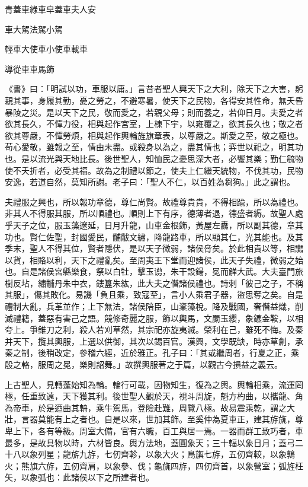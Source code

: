 
\begin{pinyinscope}
青蓋車綠車皁蓋車夫人安

車大駕法駕小駕

輕車大使車小使車載車

導從車車馬飾

《書》曰：「明試以功，車服以庸。」言昔者聖人興天下之大利，除天下之大害，躬親其事，身履其勤，憂之勞之，不避寒暑，使天下之民物，各得安其性命，無夭昏暴陵之災。是以天下之民，敬而愛之，若親父母；則而養之，若仰日月。夫愛之者欲其長久，不憚力役，相與起作宮室，上棟下宇，以雍覆之，欲其長久也；敬之者欲其尊嚴，不憚勞煩，相與起作輿輪旌旗章表，以尊嚴之。斯愛之至，敬之極也。苟心愛敬，雖報之至，情由未盡。或殺身以為之，盡其情也；弈世以祀之，明其功也。是以流光與天地比長。後世聖人，知恤民之憂思深大者，必饗其樂；勤仁毓物使不夭折者，必受其福。故為之制禮以節之，使夫上仁繼天統物，不伐其功，民物安逸，若道自然，莫知所謝。老子曰：「聖人不仁，以百姓為芻狗。」此之謂也。

夫禮服之興也，所以報功章德，尊仁尚賢。故禮尊貴貴，不得相踰，所以為禮也。非其人不得服其服，所以順禮也。順則上下有序，德薄者退，德盛者縟。故聖人處乎天子之位，服玉藻邃延，日月升龍，山車金根飾，黃屋左纛，所以副其德，章其功也。賢仁佐聖，封國愛民，黼黻文繡，降龍路車，所以顯其仁，光其能也。及其季末，聖人不得其位，賢者隱伏，是以天子微弱，諸侯脅矣。於此相貴以等，相讟以貨，相賂以利，天下之禮亂矣。至周夷王下堂而迎諸侯，此天子失禮，微弱之始也。自是諸侯宮縣樂食，祭以白牡，擊玉谫，朱干設鍚，冕而觯大武。大夫臺門旅樹反坫，繡黼丹朱中衣，鏤簋朱紘，此大夫之僭諸侯禮也。詩刺「彼己之子，不稱其服」，傷其敗化。易譏「負且乘，致寇至」，言小人乘君子器，盜思奪之矣。自是禮制大亂，兵革並作；上下無法，諸侯陪臣，山楶藻梲。降及戰國，奢僭益熾，削滅禮籍，蓋惡有害己之語。競修奇麗之服，飾以輿馬，文罽玉纓，象鑣金鞍，以相夸上。爭錐刀之利，殺人若刈草然，其宗祀亦旋夷滅。榮利在己，雖死不悔。及秦并天下，攬其輿服，上選以供御，其次以錫百官。漢興，文學既缺，時亦草創，承秦之制，後稍改定，參稽六經，近於雅正。孔子曰：「其或繼周者，行夏之正，乘殷之輅，服周之冕，樂則韶舞。」故撰輿服著之于篇，以觀古今損益之義云。

上古聖人，見轉蓬始知為輪。輪行可載，因物知生，復為之輿。輿輪相乘，流運罔極，任重致遠，天下獲其利。後世聖人觀於天，視斗周旋，魁方杓曲，以攜龍、角為帝車，於是迺曲其輈，乘牛駕馬，登險赴難，周覽八極。故易震乘乾，謂之大壯，言器莫能有上之者也。自是以來，世加其飾。至奚仲為夏車正，建其斿旐，尊卑上下，各有等級。周室大備，官有六職，百工與居一焉。一器而群工致巧者，車最多，是故具物以時，六材皆良。輿方法地，蓋圓象天；三十輻以象日月；蓋弓二十八以象列星；龍旂九斿，七仞齊軫，以象大火；鳥旟七斿，五仞齊較，以象鶉火；熊旗六斿，五仞齊肩，以象參、伐；龜旐四斿，四仞齊首，以象營室；弧旌枉矢，以象弧也：此諸侯以下之所建者也。


\end{pinyinscope}
